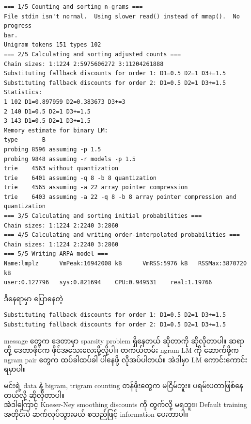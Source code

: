 \documentclass[11pt]{article}
\begin{document}
    \begin{Verbatim}[commandchars=\\\{\}]
=== 1/5 Counting and sorting n-grams ===
File stdin isn't normal.  Using slower read() instead of mmap().  No progress
bar.
Unigram tokens 151 types 102
=== 2/5 Calculating and sorting adjusted counts ===
Chain sizes: 1:1224 2:5975606272 3:11204261888
Substituting fallback discounts for order 1: D1=0.5 D2=1 D3+=1.5
Substituting fallback discounts for order 2: D1=0.5 D2=1 D3+=1.5
Statistics:
1 102 D1=0.897959 D2=0.383673 D3+=3
2 140 D1=0.5 D2=1 D3+=1.5
3 143 D1=0.5 D2=1 D3+=1.5
Memory estimate for binary LM:
type       B
probing 8596 assuming -p 1.5
probing 9848 assuming -r models -p 1.5
trie    4563 without quantization
trie    6401 assuming -q 8 -b 8 quantization
trie    4565 assuming -a 22 array pointer compression
trie    6403 assuming -a 22 -q 8 -b 8 array pointer compression and quantization
=== 3/5 Calculating and sorting initial probabilities ===
Chain sizes: 1:1224 2:2240 3:2860
=== 4/5 Calculating and writing order-interpolated probabilities ===
Chain sizes: 1:1224 2:2240 3:2860
=== 5/5 Writing ARPA model ===
Name:lmplz      VmPeak:16942008 kB      VmRSS:5976 kB   RSSMax:3870720 kB
user:0.127796   sys:0.821694    CPU:0.949531    real:1.19766
    \end{Verbatim}

    {\burmesefont ဒီနေရာမှာ} {\burmesefont ပြောနေတဲ့}

\begin{verbatim}
Substituting fallback discounts for order 1: D1=0.5 D2=1 D3+=1.5
Substituting fallback discounts for order 2: D1=0.5 D2=1 D3+=1.5
\end{verbatim}

message {\burmesefont တွေက} {\burmesefont ဒေတာမှာ} sparsity problem {\burmesefont ရှိနေတယ်} {\burmesefont ဆိုတာကို} {\burmesefont ဆိုလိုတာပါ။} {\burmesefont ဆရာတို့} {\burmesefont ဒေတာဖိုင်က}
{\burmesefont ဖိုင်အသေးလေးမို့လို့ပါ။} {\burmesefont တကယ်တမ်း} ngram LM {\burmesefont ကို} {\burmesefont ဆောက်ဖို့က} ngram pair {\burmesefont တွေက} {\burmesefont ထပ်ခါထပ်ခါ} {\burmesefont ပါနေဖို့}
{\burmesefont လိုအပ်ပါတယ်။} {\burmesefont အဲဒါမှာ} LM {\burmesefont ကောင်းကောင်း} {\burmesefont ရမှာပါ။}

{\burmesefont မင်းရဲ့} data {\burmesefont နဲ့} bigram, trigram counting {\burmesefont တန်ဖိုးတွေက} {\burmesefont မငြိမ်ဘူး။} {\burmesefont ပရမ်းပတာဖြစ်နေတယ်လို့}
{\burmesefont ဆိုလိုတာပါ။}\\
{\burmesefont အဲဒါကြောင့်} Kneser-Ney smoothing discounts {\burmesefont ကို} {\burmesefont တွက်လို့} {\burmesefont မရဘူး။} Default training
{\burmesefont အတိုင်းပဲ} {\burmesefont ဆက်လုပ်သွားမယ်} {\burmesefont စသည်ဖြင့်} information {\burmesefont ပေးတာပါ။}
\end{document}

